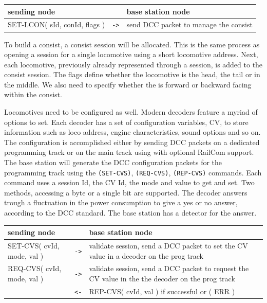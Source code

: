 \begin{table}[ht!]
    \begin{center}
        \begin{tabular}{|p{}| c |p{}|}
            \toprule
            \textbf{sending node} & & \textbf{ base station node} \\
            \midrule
            SET-LCON( sId, conId, flags ) & \texttt{->} & send DCC packet to manage the consist  \\
            \bottomrule
        \end{tabular}
    \end{center}
\end{table}

To build a consist, a consist session will be allocated. This is the same process as opening a session for a single locomotive using a short locomotive address. Next, each locomotive, previously already represented through a session, is added to the consist session. The flags define whether the locomotive is the head, the tail or in the middle. We also need to specify whether the is forward or backward facing within the consist.


Locomotives need to be configured as well. Modern decoders feature a myriad of options to set. Each decoder has a set of configuration variables, CV, to store information such as loco address, engine characteristics, sound options and so on. The configuration is accomplished either by sending DCC packets on a dedicated programming track or on the main track using with optional RailCom support. The base station will generate the DCC configuration packets for the programming track using the \texttt{(SET-CVS)}, \texttt{(REQ-CVS)}, \texttt{(REP-CVS)} commands. Each command uses a session Id, the CV Id, the mode and value to get and set. Two methods, accessing a byte or a single bit are supported. The decoder answers trough a fluctuation in the power consumption to give a yes or no answer, according to the DCC standard. The base station has a detector for the answer.

\begin{table}[ht!]
    \begin{center}
        \begin{tabular}{|p{}| c |p{}|}
            \toprule
            \textbf{sending node} & & \textbf{ base station node} \\
            \midrule
            SET-CVS( cvId, mode, val ) & \texttt{->} & validate session, send a DCC packet to set the CV value in a decoder on the prog track \\
            \midrule
            REQ-CVS( cvId, mode, val ) & \texttt{->} & validate session, send a DCC packet to request the CV value in the the decoder on the prog track \\
            & \texttt{<-} & REP-CVS( cvId, val ) if successful or ( ERR ) \\ 
            \bottomrule
        \end{tabular}
    \end{center}
\end{table}

